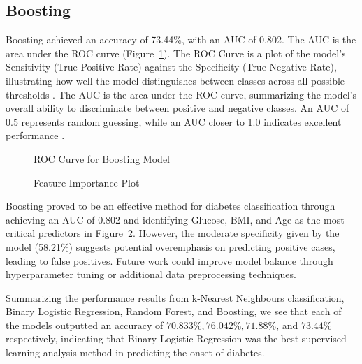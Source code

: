 \documentclass[12pt]{article}
\begin{document}
\subsection{Boosting}

\indent
\onehalfspacing

Boosting achieved an accuracy of 73.44\%, with an AUC of 0.802. The AUC is the area under the ROC curve (Figure~\ref{fig:roc}). The ROC Curve is a plot of the model’s Sensitivity (True Positive Rate) against the Specificity (True Negative Rate), illustrating how well the model distinguishes between classes across all possible thresholds \citep{fawcett2006introduction}. The AUC is the area under the ROC curve, summarizing the model's overall ability to discriminate between positive and negative classes. An AUC of 0.5 represents random guessing, while an AUC closer to 1.0 indicates excellent performance \citep{pROC,fawcett2006introduction}.

\begin{figure}[h!]
	\centering
	\caption{ROC Curve for Boosting Model}
	\label{fig:roc}
\end{figure}

\begin{figure}[h!]
	\centering
 	\caption{Feature Importance Plot}
 	\label{fig:importance}
\end{figure}

Boosting proved to be an effective method for diabetes classification through achieving an AUC of 0.802 and identifying Glucose, BMI, and Age as the most critical predictors in Figure~\ref{fig:importance}. However, the moderate specificity given by the model (58.21\%) suggests potential overemphasis on predicting positive cases, leading to false positives. Future work could improve model balance through hyperparameter tuning or additional data preprocessing techniques.

\begin{indent}
	
Summarizing the performance results from k-Nearest Neighbours classification, Binary Logistic Regression, Random Forest, and Boosting, we see that each of the models outputted an accuracy of $70.833\%, 76.042\%, 71.88\%$, and $73.44\%$ respectively, indicating that Binary Logistic Regression was the best supervised learning analysis method in predicting the onset of diabetes. 

\end{indent}
\end{document}
